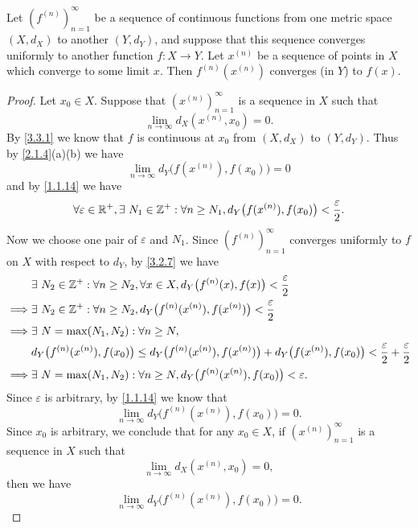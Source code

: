 \begin{prop}\label{3.3.4}
  Let \((f^{(n)})_{n = 1}^\infty\) be a sequence of continuous functions from one metric space \((X, d_X)\) to another \((Y, d_Y)\), and suppose that this sequence converges uniformly to another function \(f : X \to Y\).
  Let \(x^{(n)}\) be a sequence of points in \(X\) which converge to some limit \(x\).
  Then \(f^{(n)}(x^{(n)})\) converges (in \(Y\)) to \(f(x)\).
\end{prop}

\begin{proof}
  Let \(x_0 \in X\).
  Suppose that \((x^{(n)})_{n = 1}^\infty\) is a sequence in \(X\) such that
  \[
    \lim_{n \to \infty} d_X(x^{(n)}, x_0) = 0.
  \]
  By \cref{3.3.1} we know that \(f\) is continuous at \(x_0\) from \((X, d_X)\) to \((Y, d_Y)\).
  Thus by \cref{2.1.4}(a)(b) we have
  \[
    \lim_{n \to \infty} d_Y\big(f(x^{(n)}), f(x_0)\big) = 0
  \]
  and by \cref{1.1.14} we have
  \[
    \forall \varepsilon \in \mathbb{R}^+, \exists\ N_1 \in \mathbb{Z}^+ : \forall n \geq N_1, d_Y\big(f(x^{(n)}), f(x_0)\big) < \dfrac{\varepsilon}{2}.
  \]
  Now we choose one pair of \(\varepsilon\) and \(N_1\).
  Since \((f^{(n)})_{n = 1}^\infty\) converges uniformly to \(f\) on \(X\) with respect to \(d_Y\), by \cref{3.2.7} we have
  \begin{align*}
             & \exists\ N_2 \in \mathbb{Z}^+ : \forall n \geq N_2, \forall x \in X, d_Y\big(f^{(n)}(x), f(x)\big) < \dfrac{\varepsilon}{2}                                                      \\
    \implies & \exists\ N_2 \in \mathbb{Z}^+ : \forall n \geq N_2, d_Y\big(f^{(n)}(x^{(n)}), f(x^{(n)})\big) < \dfrac{\varepsilon}{2}                                                           \\
    \implies & \exists\ N = \max(N_1, N_2) : \forall n \geq N,                                                                                                                          \\
             & d_Y\big(f^{(n)}(x^{(n)}), f(x_0)\big) \leq d_Y\big(f^{(n)}(x^{(n)}), f(x^{(n)})\big) + d_Y\big(f(x^{(n)}), f(x_0)\big) < \dfrac{\varepsilon}{2} + \dfrac{\varepsilon}{2} \\
    \implies & \exists\ N = \max(N_1, N_2) : \forall n \geq N, d_Y\big(f^{(n)}(x^{(n)}), f(x_0)\big) < \varepsilon.
  \end{align*}
  Since \(\varepsilon\) is arbitrary, by \cref{1.1.14} we know that
  \[
    \lim_{n \to \infty} d_Y\big(f^{(n)}(x^{(n)}), f(x_0)\big) = 0.
  \]
  Since \(x_0\) is arbitrary, we conclude that for any \(x_0 \in X\), if \((x^{(n)})_{n = 1}^\infty\) is a sequence in \(X\) such that
  \[
    \lim_{n \to \infty} d_X(x^{(n)}, x_0) = 0,
  \]
  then we have
  \[
    \lim_{n \to \infty} d_Y\big(f^{(n)}(x^{(n)}), f(x_0)\big) = 0.
  \]
\end{proof}

